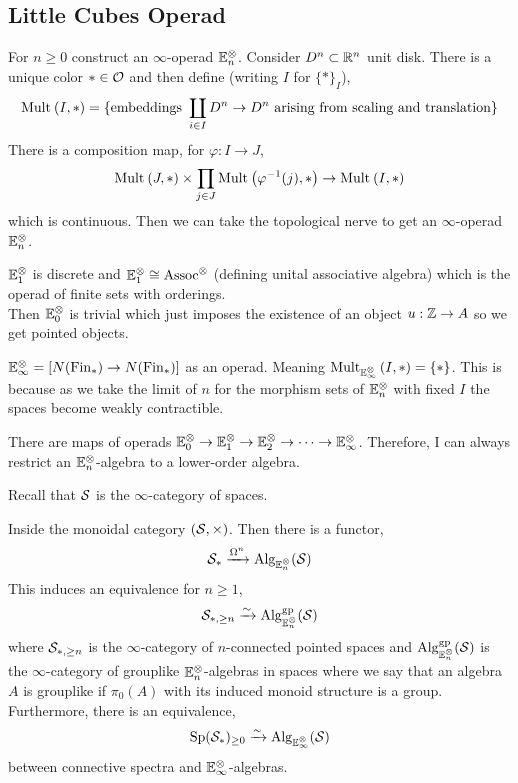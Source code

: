\documentclass[12pt]{article}
\begin{document}
\subsection{Little Cubes Operad}

\renewcommand{\E}{\mathbb{E}}

For $n \ge 0$ construct an $\infty$-operad $\E_n^{\ot}$. Consider $D^n \subset \RR^n$ unit disk. There is a unique color $* \in \O$ and then define (writing $I$ for $\{ * \}_I$),
\[ \Mult{}{I}{*} = \{ \text{embeddings } \coprod_{i \in I} D^n \to D^n \text{ arising from scaling and translation} \} \]
There is a composition map, for $\varphi : I \to J$,
\[ \Mult{}{J}{*} \times \prod_{j \in J} \Mult{}{\varphi^{-1}(j)}{*} \to \Mult{}{I}{*} \]
which is continuous. Then we can take the topological nerve to get an $\infty$-operad $\E_n^{\ot}$. 

\begin{rmk}
$\E_1^\ot$ is discrete and $\E^{\ot}_1 \cong \mathrm{Assoc}^\ot$ (defining unital associative algebra) which is the operad of finite sets with orderings. 
\bigskip\\
Then $\E_0^{\ot}$ is trivial which just imposes the existence of an object $u : \Z \to A$ so we get pointed objects.
\end{rmk}

\begin{defn}
$\E^\ot_{\infty} = [N(\Fin_*) \to N(\Fin_*)]$ as an operad. Meaning $\Mult{\E_\infty^{\ot}}{I}{*} = \{ * \}$. This is because as we take the limit of $n$ for the morphism sets of $\E_n^{\ot}$ with fixed $I$ the spaces become weakly contractible.
\end{defn}

There are maps of operads $\E_0^{\ot} \to \E_1^{\ot} \to \E_2^{\ot} \to \cdots \to \E^{\ot}_{\infty}$. Therefore, I can always restrict an $\E_n^\ot$-algebra to a lower-order algebra. 

\newcommand{\Alg}{\mathrm{Alg}}
\newcommand{\gp}{\mathrm{gp}}

\begin{rmk}
Recall that $\S$ is the $\infty$-category of spaces.
\end{rmk}

\begin{theorem}[May]
Inside the monoidal category $(\S, \times)$. Then there is a functor,
\[ \S_* \xrightarrow{\Omega^n} \Alg_{\E^\ot_n}(\S) \] 
This induces an equivalence for $n \ge 1$,
\[ \S_{*, \ge n} \iso \Alg_{\E^\ot_n}^{\gp}(\S) \]
where $\S_{*, \ge n}$ is the $\infty$-category of $n$-connected pointed spaces and $\Alg_{\E^\ot_n}^{\gp}(\S)$ is the $\infty$-category of grouplike $\E_n^{\ot}$-algebras in spaces where we say that an algebra $A$ is grouplike if $\pi_0(A)$ with its induced monoid structure is a group. Furthermore, there is an equivalence,
\[ \Sp(\S_*)_{\ge 0} \iso \Alg_{\E_\infty^\ot}(\S) \]
between connective spectra and $\E_\infty^\ot$-algebras. 
\end{theorem}
\end{document}
